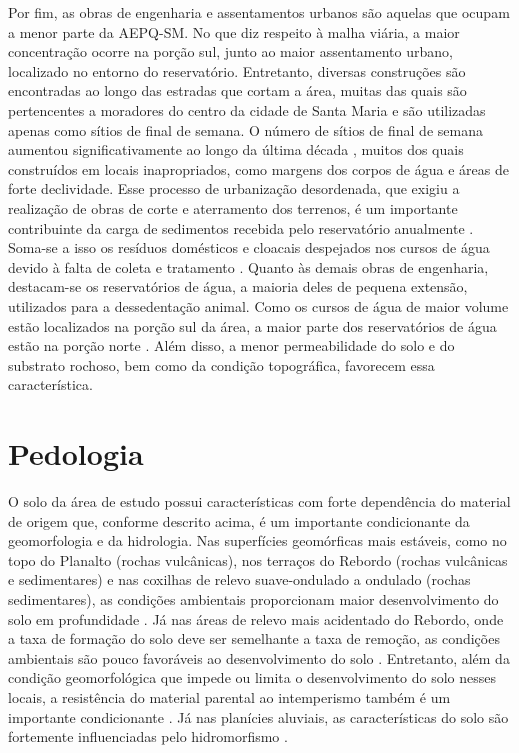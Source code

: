 \documentclass[final]{article}
\begin{document}
Por fim, as obras de engenharia e assentamentos urbanos são aquelas que ocupam a menor parte da AEPQ-SM. No que diz respeito à malha viária, a maior concentração ocorre na porção sul, junto ao maior assentamento urbano, localizado no entorno do reservatório. Entretanto, diversas construções são encontradas ao longo das estradas que cortam a área, muitas das quais são pertencentes a moradores do centro da cidade de Santa Maria e são utilizadas apenas como sítios de final de semana. O número de sítios de final de semana aumentou significativamente ao longo da última década \cite{Goldani2006}, muitos dos quais construídos em locais inapropriados, como margens dos corpos de água e áreas de forte declividade. Esse processo de urbanização desordenada, que exigiu a realização de obras de corte e aterramento dos terrenos, é um importante contribuinte da carga de sedimentos recebida pelo reservatório anualmente \cite{PaivaEtAl2001, DillEtAl2004}. Soma-se a isso os resíduos domésticos e cloacais despejados nos cursos de água devido à falta de coleta e tratamento \cite{Goldani2006}. Quanto às demais obras de engenharia, destacam-se os reservatórios de água, a maioria deles de pequena extensão, utilizados para a dessedentação animal. Como os cursos de água de maior volume estão localizados na porção sul da área, a maior parte dos reservatórios de água estão na porção norte \cite{SamuelRosaEtAl2011a}. Além disso, a menor permeabilidade do solo e do substrato rochoso, bem como da condição topográfica, favorecem essa característica.

\section{Pedologia}

O solo da área de estudo possui características com forte dependência do material de origem \cite{NascimentoEtAl2010} que, conforme descrito acima, é um importante condicionante da geomorfologia e da hidrologia. Nas superfícies geomórficas mais estáveis, como no topo do Planalto (rochas vulcânicas), nos terraços do Rebordo (rochas vulcânicas e sedimentares) e nas coxilhas de relevo suave-ondulado a ondulado (rochas sedimentares), as condições ambientais proporcionam maior desenvolvimento do solo em profundidade \cite{Moser1990}. Já nas áreas de relevo mais acidentado do Rebordo, onde a taxa de formação do solo deve ser semelhante a taxa de remoção, as condições ambientais são pouco favoráveis ao desenvolvimento do solo \cite{Moser1990, DalmolinEtAl2006a, Sturmer2008, SamuelRosaEtAl2011a}. Entretanto, além da condição geomorfológica que impede ou limita o desenvolvimento do solo nesses locais, a resistência do material parental ao intemperismo também é um importante condicionante \cite{Pedron2007}. Já nas planícies aluviais, as características do solo são fortemente influenciadas pelo hidromorfismo \cite{Moser1990, Miguel2010}.
\end{document}
